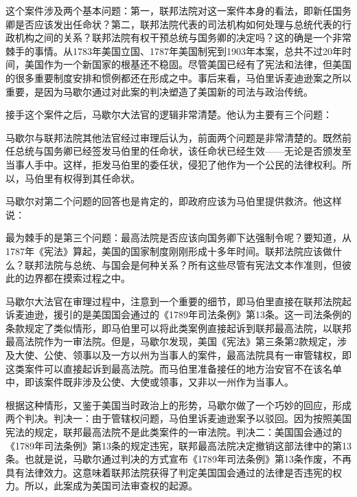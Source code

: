 这个案件涉及两个基本问题：第一，联邦法院对这一案件本身的看法，即新任国务卿是否应该发出任命状？第二，联邦法院代表的司法机构如何处理与总统代表的行政机构之间的关系？联邦法院有权干预总统与国务卿的决定吗？这的确是一个非常棘手的事情。从1783年美国立国、1787年美国制宪到1903年本案，总共不过20年时间，美国作为一个新国家的根基还不稳固。尽管美国已经有了宪法和法律，但美国的很多重要制度安排和惯例都还在形成之中。事后来看，马伯里诉麦迪逊案之所以重要，是因为马歇尔通过对此案的判决塑造了美国新的司法与政治传统。

接手这个案件之后，马歇尔大法官的逻辑非常清楚。他认为主要有三个问题：


马歇尔与联邦法院其他法官经过审理后认为，前面两个问题是非常清楚的。既然前任总统与国务卿已经签发马伯里的任命状，该任命状已经生效——无论是否颁发至当事人手中。这样，拒发马伯里的委任状，侵犯了他作为一个公民的法律权利。所以，马伯里有权得到其任命状。

马歇尔对第二个问题的回答也是肯定的，即政府应该为马伯里提供救济。他这样说：


最为棘手的是第三个问题：最高法院是否应该向国务卿下达强制令呢？要知道，从1787年《宪法》算起，美国的国家制度刚刚形成十多年时间。联邦法院应该做什么？联邦法院与总统、与国会是何种关系？所有这些尽管有宪法文本作准则，但彼此的边界都在摸索过程之中。

马歇尔大法官在审理过程中，注意到一个重要的细节，即马伯里直接在联邦法院起诉麦迪逊，援引的是美国国会通过的《1789年司法条例》第13条。这一司法条例的条款规定了类似情形，即马伯里可以将此类案例直接起诉到联邦最高法院，以联邦最高法院作为一审法院。但是，马歇尔发现，美国《宪法》第三条第2款规定，涉及大使、公使、领事以及一方以州为当事人的案件，最高法院具有一审管辖权，即这类案件可以直接起诉到最高法院。而马伯里准备接任的地方治安官不在该名单中，即该案件既非涉及公使、大使或领事，又非以一州作为当事人。

根据这种情形，又鉴于美国当时政治上的形势，马歇尔做了一个巧妙的回应，形成两个判决。判决一：由于管辖权问题，马伯里诉麦迪逊案予以驳回。因为按照美国宪法的规定，联邦最高法院不是此类案件的一审法院。判决二：美国国会通过的《1789年司法条例》第13条的规定违宪，联邦最高法院决定撤销这部法律中的第13条。也就是说，马歇尔通过判决的方式宣布《1789年司法条例》第13条作废，不再具有法律效力。这意味着联邦法院获得了判定美国国会通过的法律是否违宪的权力。所以，此案成为美国司法审查权的起源。

